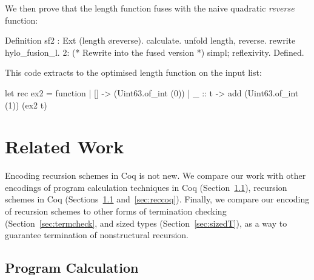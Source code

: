 \documentclass[ a4paper, UKenglish, cleveref, autoref, thm-restate]{lipics-v2021}
\begin{document}
We then prove that the length function fuses with
the naive quadratic \emph{reverse} function:
\begin{coqcode}
Definition sf2 : Ext (length \o reverse).
  calculate.  unfold length, reverse. rewrite hylo_fusion_l.
  2:{ (* Rewrite into the fused version *) }
  simpl; reflexivity.
Defined.
\end{coqcode}
This code extracts to the optimised length function on the input list:
\begin{ocamlcode}
let rec ex2 = function | [] -> (Uint63.of_int (0))
                       | _ :: t -> add (Uint63.of_int (1)) (ex2 t)
\end{ocamlcode}

\section{Related Work}
%
Encoding recursion schemes in Coq is not new. We compare our work with other
encodings of program calculation techniques in Coq (Section~\ref{sec:calccoq}),
recursion schemes in Coq (Sections~\ref{sec:calccoq} and~\ref{sec:reccoq}).
Finally, we compare our encoding of recursion schemes to other forms of
termination checking (Section~\ref{sec:termcheck}, and sized types
(Section~\ref{sec:sizedT}), as a way to guarantee termination of nonstructural
recursion.


\subsection{Program Calculation}\label{sec:calccoq}
\end{document}
